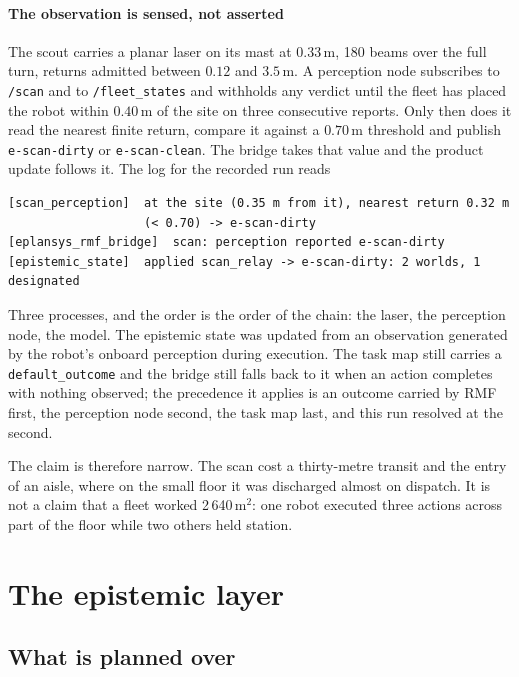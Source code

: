 \documentclass[11pt,a4paper]{article}
\theoremstyle{definition}
\newcommand{\code}[1]{\texttt{\small #1}}
\begin{document}
\paragraph{The observation is sensed, not asserted} The scout carries a planar
laser on its mast at $0.33$\,m, 180 beams over the full turn, returns admitted
between $0.12$ and $3.5$\,m. A perception node subscribes to \code{/scan} and to
\code{/fleet\_states} and withholds any verdict until the fleet has placed the
robot within $0.40$\,m of the site on three consecutive reports. Only then does
it read the nearest finite return, compare it against a $0.70$\,m threshold and
publish \code{e-scan-dirty} or \code{e-scan-clean}. The bridge takes that value
and the product update follows it. The log for the recorded run reads

\begin{lstlisting}
[scan_perception]  at the site (0.35 m from it), nearest return 0.32 m
                   (< 0.70) -> e-scan-dirty
[eplansys_rmf_bridge]  scan: perception reported e-scan-dirty
[epistemic_state]  applied scan_relay -> e-scan-dirty: 2 worlds, 1 designated
\end{lstlisting}

\noindent
Three processes, and the order is the order of the chain: the laser, the
perception node, the model. The epistemic state was updated from an observation
generated by the robot's onboard perception during execution. The task map still
carries a \code{default\_outcome} and the bridge still falls back to it when an
action completes with nothing observed; the precedence it applies is an outcome
carried by RMF first, the perception node second, the task map last, and this
run resolved at the second.

The claim is therefore narrow. The scan cost a thirty-metre transit and the
entry of an aisle, where on the small floor it was discharged almost on
dispatch. It is not a claim that a fleet worked 2\,640\,m$^2$: one robot
executed three actions across part of the floor while two others held station.

\section{The epistemic layer}
\label{sec:epistemic}

\subsection{What is planned over}
\end{document}
